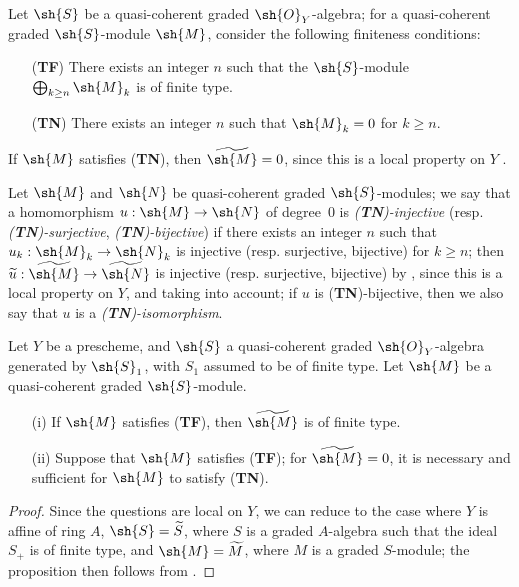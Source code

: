 \begin{env}[3.4.2]
\label{II.3.4.2}
Let $\sh{S}$ be a quasi-coherent graded $\sh{O}_Y$-algebra;
for a quasi-coherent graded $\sh{S}$-module $\sh{M}$, consider the following finiteness conditions:
\begin{enumerate}
  \item[(\textbf{TF})] There exists an integer $n$ such that the $\sh{S}$-module $\bigoplus_{k\geq n}\sh{M}_k$ is of finite type.
  \item[(\textbf{TN})] There exists an integer $n$ such that $\sh{M}_k=0$ for $k\geq n$.
\end{enumerate}

If $\sh{M}$ satisfies (\textbf{TN}), then $\widetilde{\sh{M}}=0$, since this is a local property on $Y$ .

Let $\sh{M}$ and $\sh{N}$ be quasi-coherent graded $\sh{S}$-modules;
we say that a homomorphism $u:\sh{M}\to\sh{N}$ of degree~$0$ is \emph{(\textbf{TN})-injective} (resp. \emph{(\textbf{TN})-surjective}, \emph{(\textbf{TN})-bijective}) if there exists an integer $n$ such that $u_k:\sh{M}_k\to\sh{N}_k$ is injective (resp. surjective, bijective) for $k\geq n$;
then $\widetilde{u}:\widetilde{\sh{M}}\to\widetilde{\sh{N}}$ is injective (resp. surjective, bijective) by , since this is a local property on $Y$, and taking  into account;
if $u$ is (\textbf{TN})-bijective, then we also say that $u$ is a \emph{(\textbf{TN})-isomorphism}.
\end{env}

\begin{proposition}[3.4.3]
\label{II.3.4.3}
Let $Y$ be a prescheme, and $\sh{S}$ a quasi-coherent graded $\sh{O}_Y$-algebra generated by $\sh{S}_1$, with $S_1$ assumed to be of finite type.
Let $\sh{M}$ be a quasi-coherent graded $\sh{S}$-module.
\begin{enumerate}
  \item[(i)] If $\sh{M}$ satisfies (\textbf{TF}), then $\widetilde{\sh{M}}$ is of finite type.
  \item[(ii)] Suppose that $\sh{M}$ satisfies (\textbf{TF});
    for $\widetilde{\sh{M}}=0$, it is necessary and sufficient for $\sh{M}$ to satisfy (\textbf{TN}).
\end{enumerate}
\end{proposition}

\begin{proof}
Since the questions are local on $Y$, we can reduce to the case where $Y$ is affine of ring $A$, $\sh{S}=\widetilde{S}$, where $S$ is a graded $A$-algebra such that the ideal $S_+$ is of finite type, and $\sh{M}=\widetilde{M}$, where $M$ is a graded $S$-module;
the proposition then follows from .
\end{proof}

